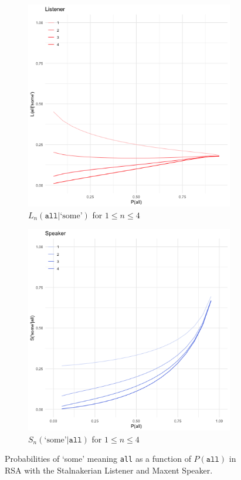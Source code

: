 \documentclass[12pt, a4paper, usenames, dvipsnames]{article}
\begin{document}
\begin{figure}[!htb]
  \begin{subfigure}{.48\linewidth} 
    \includegraphics[width=\textwidth]{graphs/shannonRSA-L.png}
    \caption{\(L_n(\texttt{all}|\text{`some'})\) for \(1\leq n\leq 4\)}
  \end{subfigure}
  \begin{subfigure}{.48\linewidth} 
    \includegraphics[width=\textwidth]{graphs/shannonRSA-S.png}
    \caption{\(S_n(\text{`some'}|\texttt{all})\) for \(1\leq n\leq 4\)}
  \end{subfigure}
  \caption{Probabilities of `some' meaning \texttt{all} as a function of \(P(\texttt{all})\) in RSA with the Stalnakerian Listener and Maxent Speaker.}
  \label{fig:shannon}
\end{figure}
\end{document}
